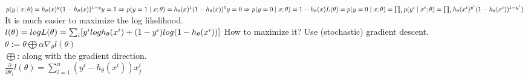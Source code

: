 \documentclass{article}
\begin{document}
\begin{Large}
$p(y\mid x; \theta)=h_\theta(x)^y(1-h_\theta(x))^{1-y}\\
y=1\Rightarrow p(y=1\mid x; \theta)=h_\theta(x)^1(1-h_\theta(x))^{0}\\
y=0\Rightarrow p(y=0\mid x; \theta)=1-h_\theta(x)\\
L(\theta)=p(y=0\mid x; \theta)=\prod_{i} p(y^{i}\mid x^{i}; \theta)=\prod_{i} h_\theta(x^{i})^{y^{i}}(1-h_\theta(x^{i}))^{1-y^{i}})$\\
It is much easier to maximize the log likelihood.\\
$l(\theta)=log L(\theta)=\sum_{i} [y^{i}log h_\theta(x^{i})+(1-y^{i})log (1-h_\theta(x^{i}))]\\$
How to maximize it? Use (stochastic) gradient descent.\\
$\theta:=\theta\bigoplus\alpha\nabla_\theta l(\theta)$\\
$\bigoplus$: along with the gradient direction.\\
$\frac{\partial }{\partial \theta_j} l(\theta) = \sum_{i=1}^{n} (y^{i}-h_\theta(x^{i}))x_j^{i} $

\end{Large}
\end{document}
